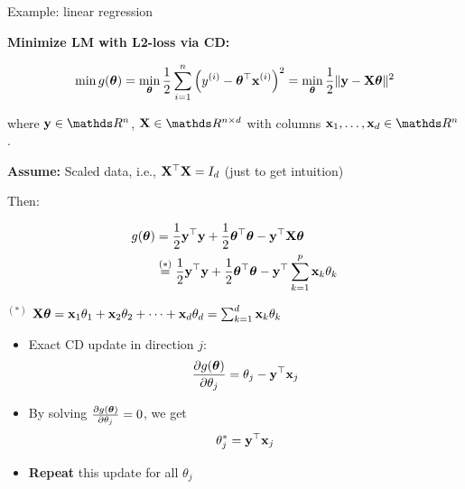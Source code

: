 \documentclass[11pt,compress,t,notes=noshow, xcolor=table]{beamer}
\begin{document}
\begin{vbframe}{Example: linear regression}

\textbf{Minimize LM with L2-loss via CD:}
\vspace*{0.2cm}

$$
    \min g(\bm{\theta}) = \min_{\bm{\theta}} \frac{1}{2}\sum\limits_{i=1}^n \left(y^{(i)} - \bm{\theta}^\top \mathbf{x}^{(i)}\right)^2 = \min_{\bm{\theta}} \frac{1}{2}\|\mathbf{y} - \mathbf{X} \bm{\theta}\|^2 
$$

where $\yv \in \R^n$, $\Xmat \in \R^{n \times d}$ with columns $\xv_1, \ldots, \xv_d \in \R^n$. 

\vspace*{0.3cm}

\textbf{Assume:} Scaled data, i.e., $\mathbf{X}^\top \mathbf{X} = I_d$ (just to get intuition)

\medskip

Then:

\vspace{-\baselineskip}

\begin{footnotesize}
\begin{align*}
    g(\bm{\theta}) &= \frac{1}{2}\mathbf{y}^\top \mathbf{y} + \frac{1}{2}\bm{\theta}^\top \bm{\theta} - \mathbf{y}^\top \mathbf{X} \bm{\theta}  \\
    &\overset{(*)}{=} \frac{1}{2}\mathbf{y}^\top \mathbf{y} + \frac{1}{2}\bm{\theta}^\top \bm{\theta} - \mathbf{y}^\top \sum_{k = 1}^p \mathbf{x}_k \theta_k 
\end{align*}

$^{(*)}$ $\mathbf{X} \bm{\theta} = \mathbf{x}_1 \theta_1 + \mathbf{x}_2 \theta_2 + \cdots + \mathbf{x}_d \theta_d = \sum_{k = 1}^d \mathbf{x}_k \theta_k$
\end{footnotesize}

\framebreak

\begin{itemize}
    \item Exact CD update in direction $j$:
        \begin{equation*}
            \frac{\partial{g}(\bm{\theta})}{\partial \theta_j} = \theta_j - \mathbf{y}^\top \mathbf{x}_j 
        \end{equation*}
    \item By solving $\frac{\partial{g}(\bm{\theta})}{\partial \theta_j} = 0$, we get 
        \begin{equation*}
            \theta_j^\ast = \mathbf{y}^\top \mathbf{x}_j
        \end{equation*}
    \item \textbf{Repeat} this update for all $\theta_j$
\end{itemize}



\end{vbframe}
\end{document}
